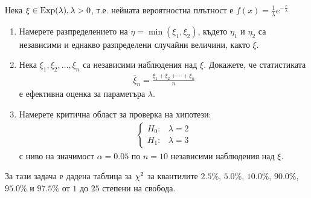 \documentclass[numbers=endperiod, bibliography=totocnumbered]{scrartcl}
\begin{document}
\begin{exercise}\label{ex:se-summer2011}
  Нека \( \xi \in \operatorname{Exp}(\lambda), \lambda > 0 \), т.е. нейната вероятностна плътност е \( f(x) = \frac 1 \lambda e^{-\frac x \lambda} \)
  \begin{enumerate}[label=\alph*)]
    \item Намерете разпределението на \( \eta = \min(\xi_1, \xi_2) \), където \( \eta_1 \) и \( \eta_2 \) са независими и еднакво разпределени случайни величини, както \( \xi \).

    \item Нека \( \xi_1, \xi_2, \ldots, \xi_n \) са независими наблюдения над \( \xi \). Докажете, че статистиката
    \begin{align*}
      \overline \xi_n = \frac {\xi_1 + \xi_2 + \cdots + \xi_n} n
    \end{align*}
    е ефективна оценка за параметъра \( \lambda \).

    \item Намерете критична област за проверка на хипотези:
    \begin{align*}
      \begin{cases}
        H_0: &\lambda = 2 \\
        H_1: &\lambda = 3
      \end{cases}
    \end{align*}
    с ниво на значимост \( \alpha = 0.05 \) по \( n = 10 \) независими наблюдения над \( \xi \).
  \end{enumerate}
\end{exercise}

\begin{note}
  За тази задача е дадена таблица за \( \operatorname{\chi^2} \) за квантилите \( 2.5\% \), \( 5.0\% \), \( 10.0\% \), \( 90.0\% \), \( 95.0\% \) и \( 97.5\% \) от \( 1 \) до \( 25 \) степени на свобода.
\end{note}
\end{document}
